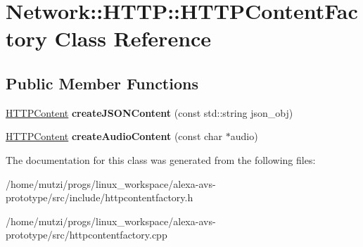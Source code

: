 \hypertarget{classNetwork_1_1HTTP_1_1HTTPContentFactory}{}\section{Network\+:\+:H\+T\+TP\+:\+:H\+T\+T\+P\+Content\+Factory Class Reference}
\label{classNetwork_1_1HTTP_1_1HTTPContentFactory}
\subsection*{Public Member Functions}
\begin{DoxyCompactItemize}
\item 
\mbox{\label{classNetwork_1_1HTTP_1_1HTTPContentFactory_a806650365553ff6ac7e2e29f3cd044fe}} 
\hyperlink{classNetwork_1_1HTTP_1_1HTTPContent}{H\+T\+T\+P\+Content} {\bfseries create\+J\+S\+O\+N\+Content} (const std\+::string json\+\_\+obj)
\item 
\mbox{\label{classNetwork_1_1HTTP_1_1HTTPContentFactory_ab81b39432fda0ac873a9adf0b4b562d3}} 
\hyperlink{classNetwork_1_1HTTP_1_1HTTPContent}{H\+T\+T\+P\+Content} {\bfseries create\+Audio\+Content} (const char $\ast$audio)
\end{DoxyCompactItemize}


The documentation for this class was generated from the following files\+:\begin{DoxyCompactItemize}
\item 
/home/mutzi/progs/linux\+\_\+workspace/alexa-\/avs-\/prototype/src/include/httpcontentfactory.\+h\item 
/home/mutzi/progs/linux\+\_\+workspace/alexa-\/avs-\/prototype/src/httpcontentfactory.\+cpp\end{DoxyCompactItemize}

